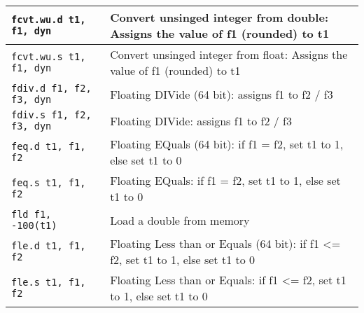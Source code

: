 \begin{table}[h]
\begin{tabularx}{\textwidth}{|l|X|}
        \hline \verb|fcvt.wu.d t1, f1, dyn| & Convert unsinged integer from double: Assigns the value of f1 (rounded) to t1 \\
        \hline \verb|fcvt.wu.s t1, f1, dyn| & Convert unsinged integer from float: Assigns the value of f1 (rounded) to t1 \\
        \hline \verb|fdiv.d f1, f2, f3, dyn| & Floating DIVide (64 bit): assigns f1 to f2 / f3 \\
        \hline \verb|fdiv.s f1, f2, f3, dyn| & Floating DIVide: assigns f1 to f2 / f3 \\
        \hline \verb|feq.d t1, f1, f2| & Floating EQuals (64 bit): if f1 = f2, set t1 to 1, else set t1 to 0 \\
        \hline \verb|feq.s t1, f1, f2| & Floating EQuals: if f1 = f2, set t1 to 1, else set t1 to 0 \\
        \hline \verb|fld f1, -100(t1)| & Load a double from memory \\
        \hline \verb|fle.d t1, f1, f2| & Floating Less than or Equals (64 bit): if f1 <= f2, set t1 to 1, else set t1 to 0 \\
        \hline \verb|fle.s t1, f1, f2| & Floating Less than or Equals: if f1 <= f2, set t1 to 1, else set t1 to 0 \\
        \hline
    \end{tabularx}
    \label{table-base-instructions2}
\end{table}

